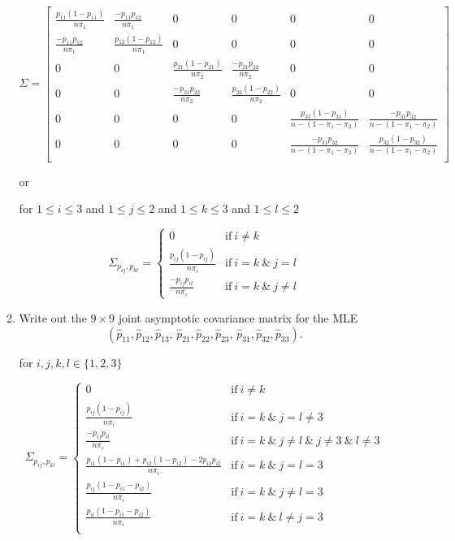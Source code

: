 \documentclass{article} %
\begin{document}
\begin{enumerate}
\begin{enumerate}
\[
\Sigma =
\begin{bmatrix}
   \frac{p_{11}(1-p_{11})}{n \pi_1} & \frac{-p_{11} p_{12}}{n \pi_1} & 0 & 0 & 0 & 0 \\
   \frac{-p_{11} p_{12}}{n \pi_1} & \frac{p_{12}(1-p_{12})}{n \pi_1} & 0 & 0 & 0 & 0 \\
   0 & 0 & \frac{p_{21}(1-p_{21})}{n \pi_2} & \frac{-p_{21} p_{22}}{n \pi_2} & 0 & 0 \\
   0 & 0 & \frac{-p_{21} p_{22}}{n \pi_2} & \frac{p_{22}(1-p_{22})}{n \pi_2} & 0 & 0 \\
   0 & 0 & 0 & 0 & \frac{p_{31}(1-p_{31})}{n - (1 -\pi_1 - \pi_2)} & \frac{-p_{31} p_{32}}{n - (1 -\pi_1 - \pi_2)} \\
   0 & 0 & 0 & 0 & \frac{-p_{31} p_{32}}{n - (1 -\pi_1 - \pi_2)} & \frac{p_{32}(1-p_{32})}{n - (1 -\pi_1 - \pi_2)} \\
\end{bmatrix}
\]

or

for $1 \leq i \leq 3$ and $1 \leq j \leq 2$ and $1 \leq k \leq 3$ and $1 \leq l \leq 2$

\begin{displaymath}
  \Sigma_{p_{ij},p_{kl}} = \left\{
    \begin{array}{lr}
      0 & \text{if} ~ i \neq k \\
      \frac{p_{ij}(1-p_{ij})}{n \pi_i} & \text{if} ~ i = k ~ \&  ~ j = l \\
      \frac{-p_{ij}p_{il}}{n \pi_i} & \text{if} ~ i = k ~ \&  ~ j \neq l
    \end{array}
  \right.
\end{displaymath}

  \item Write out the $9\times 9$ joint asymptotic covariance matrix
    for the MLE
    \[
    \left(\hat p_{11},\hat p_{12},\hat p_{13},\, \hat p_{21},\hat
      p_{22},\hat p_{23},\, \hat p_{31},\hat p_{32},\hat p_{33}\right).
    \]

for $i, j, k, l \in \{ 1, 2, 3 \}$

\begin{displaymath}
  \Sigma_{p_{ij},p_{kl}} = \left\{
    \begin{array}{lr}
      0 & \text{if} ~ i \neq k \\
      \frac{p_{ij}(1-p_{ij})}{n \pi_i} & \text{if} ~ i = k ~ \&  ~ j = l \neq 3 \\
      \frac{-p_{ij}p_{il}}{n \pi_i} & \text{if} ~ i = k ~ \&  ~ j \neq l ~ \& ~ j \neq 3 ~ \& ~ l \neq 3 \\
      \frac{p_{i1}(1 - p_{i1}) + p_{i2}(1 - p_{i2}) - 2p_{i1}p_{i2}}{n \pi_i} & \text{if} ~ i = k ~ \&  ~ j = l = 3 \\
      \frac{p_{ij}(1 - p_{i1} - p_{i2})}{n \pi_i} & \text{if} ~ i = k ~ \&  ~ j \neq l = 3 \\
      \frac{p_{il}(1 - p_{i1} - p_{i2})}{n \pi_i} & \text{if} ~ i = k ~ \&  ~ l \neq j = 3 \\
    \end{array}
  \right.
\end{displaymath}



\end{enumerate}
\end{enumerate}
\end{document}
